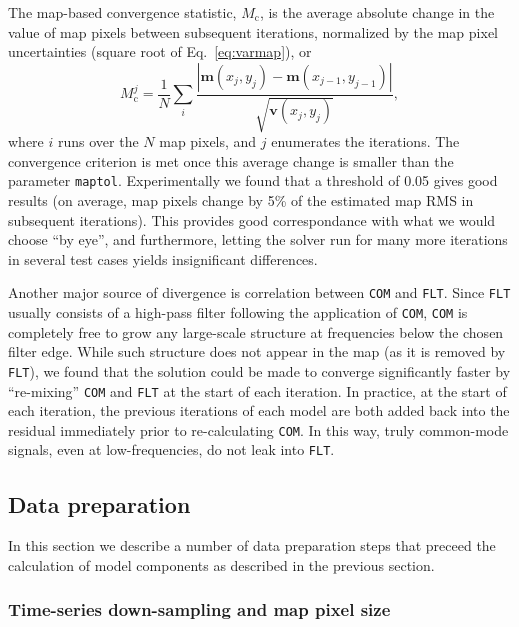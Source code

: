 \documentclass[useAMS,usenatbib,nofootinbib]{mn2e}
\newcommand{\model}[1]{\texttt{#1}}
\begin{document}
The map-based convergence statistic, $M_\mathrm{c}$, is the average
absolute change in the value of map pixels between subsequent
iterations, normalized by the map pixel uncertainties (square root of
Eq.~\ref{eq:varmap}), or
%
\begin{equation}
M^j_\mathrm{c} = \frac{1}{N} \sum_i \frac{| \mathbf{m}(x_j,y_j) -
  \mathbf{m}(x_{j-1},y_{j-1}) |} {\sqrt{\mathbf{v}(x_j,y_j)}} ,
\end{equation}
%
where $i$ runs over the $N$ map pixels, and $j$ enumerates the
iterations. The convergence criterion is met once this average change
is smaller than the parameter \texttt{maptol}. Experimentally we found
that a threshold of 0.05 gives good results (on average, map pixels
change by 5\% of the estimated map RMS in subsequent iterations).
This provides good correspondance with what we would choose ``by
eye'', and furthermore, letting the solver run for many more
iterations in several test cases yields insignificant differences.

Another major source of divergence is correlation between \model{COM}
and \model{FLT}. Since \model{FLT} usually consists of a high-pass
filter following the application of \model{COM}, \model{COM} is
completely free to grow any large-scale structure at frequencies below
the chosen filter edge. While such structure does not appear in the
map (as it is removed by \model{FLT}), we found that the solution
could be made to converge significantly faster by ``re-mixing''
\model{COM} and \model{FLT} at the start of each iteration. In
practice, at the start of each iteration, the previous iterations of
each model are both added back into the residual immediately prior to
re-calculating \model{COM}. In this way, truly common-mode signals,
even at low-frequencies, do not leak into \model{FLT}.

\subsection{Data preparation}
\label{sec:dataprep}

In this section we describe a number of data preparation steps that
preceed the calculation of model components as described in the
previous section.

\subsubsection{Time-series down-sampling and map pixel size}
\label{sec:downsamp}
\end{document}
